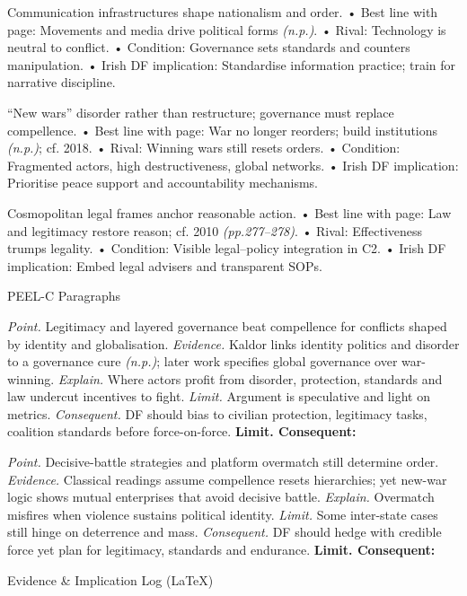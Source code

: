 Communication infrastructures shape nationalism and order.
• Best line with page: Movements and media drive political forms \emph{(n.p.)}.
• Rival: Technology is neutral to conflict.
• Condition: Governance sets standards and counters manipulation.
• Irish DF implication: Standardise information practice; train for narrative discipline.

“New wars” disorder rather than restructure; governance must replace compellence.
• Best line with page: War no longer reorders; build institutions \emph{(n.p.)}; cf. 2018.
• Rival: Winning wars still resets orders.
• Condition: Fragmented actors, high destructiveness, global networks.
• Irish DF implication: Prioritise peace support and accountability mechanisms.

Cosmopolitan legal frames anchor reasonable action.
• Best line with page: Law and legitimacy restore reason; cf. 2010 \emph{(pp.277–278)}.
• Rival: Effectiveness trumps legality.
• Condition: Visible legal–policy integration in C2.
• Irish DF implication: Embed legal advisers and transparent SOPs.

PEEL-C Paragraphs

\textit{Point.} Legitimacy and layered governance beat compellence for conflicts shaped by identity and globalisation.
\textit{Evidence.} Kaldor links identity politics and disorder to a governance cure \emph{(n.p.)}; later work specifies global governance over war-winning.
\textit{Explain.} Where actors profit from disorder, protection, standards and law undercut incentives to fight.
\textit{Limit.} Argument is speculative and light on metrics.
\textit{Consequent.} DF should bias to civilian protection, legitimacy tasks, coalition standards before force-on-force. \textbf{Limit. Consequent:}

\textit{Point.} Decisive-battle strategies and platform overmatch still determine order.
\textit{Evidence.} Classical readings assume compellence resets hierarchies; yet new-war logic shows mutual enterprises that avoid decisive battle.
\textit{Explain.} Overmatch misfires when violence sustains political identity.
\textit{Limit.} Some inter-state cases still hinge on deterrence and mass.
\textit{Consequent.} DF should hedge with credible force yet plan for legitimacy, standards and endurance. \textbf{Limit. Consequent:}

Evidence \& Implication Log (LaTeX)

